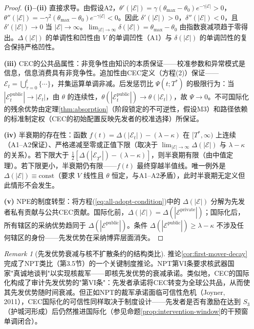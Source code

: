 \documentclass[12pt,a4paper]{ctexart}
\theoremstyle{definition}
\theoremstyle{remark}
\newtheorem{remark}{Remark}[section]
\begin{document}
\begin{proof}
\textbf{(i)--(ii)} 直接求导。由假设A2，$\theta'(|\mathcal{E}|) = \gamma(\theta_{\max} - \theta_0)e^{-\gamma |\mathcal{E}|} > 0$，$\theta''(|\mathcal{E}|) = -\gamma^2(\theta_{\max} - \theta_0)e^{-\gamma |\mathcal{E}|} < 0$。因此 $\delta'(|\mathcal{E}|) > 0$，$\delta''(|\mathcal{E}|) < 0$，且 $\delta'(|\mathcal{E}|) \to 0$ 当 $|\mathcal{E}| \to \infty$。$\lim_{|\mathcal{E}| \to \infty} \delta(|\mathcal{E}|) = \theta_{\max} - \theta_0$ 由指数衰减项趋于零得出。$\Delta(|\mathcal{E}|)$ 的单调性和凹性由 $V$ 的单调凹性（A1）与 $\delta(|\mathcal{E}|)$ 的单调凹性的复合保持严格凹性。

\textbf{(iii)} CEC的公共品属性：非竞争性由知识的本质保证——校准参数和异常模式是信息，信息消费具有非竞争性。追加性由CEC定义（方程(2)）保证——$\mathcal{E}_t = \bigcup_{\tau=0}^{t} \{\cdots\}$，并集运算单调非减。后发惩罚比 $\Psi(t; T^*)$ 的极限行为：当 $|\mathcal{E}_t^{\text{public}}| \to |\mathcal{E}_t|$，由 $\theta$ 的连续性，$\theta(|\mathcal{E}_t^{\text{public}}|) \to \theta(|\mathcal{E}_t|)$，故 $\Psi \to 0$。不可国际化的残余优势由定理\ref{thm:absorption}（阶段锁定的不可逆性，假设M3）和路径依赖的标准制定权（CEC的初始配置反映先发者的校准选择）所保证。

\textbf{(iv)} 半衰期的存在性：函数 $f(t) = \Delta(|\mathcal{E}_t|) - (\lambda - \kappa)$ 在 $[T^*, \infty)$ 上连续（A1--A2保证）、严格递减至零或正值下限（取决于 $\lim_{|\mathcal{E}| \to \infty} \Delta(|\mathcal{E}|)$ 与 $\lambda - \kappa$ 的关系）。若下限大于 $\frac{1}{2}[\Delta(|\mathcal{E}_{T^*}|) - (\lambda - \kappa)]$，则半衰期有限（由中值定理）。若下限更小，半衰期仍有限——$f(t)$ 最终穿越半值线。唯一例外是 $\Delta(|\mathcal{E}|) \equiv \text{const}$（要求 $V$ 线性且 $\theta$ 恒定，与A1--A2矛盾），此时半衰期无定义但此情形不会发生。

\textbf{(v)} NPE的制度转型：将方程(\ref{eq:all-adopt-condition})中的 $\Delta(|\mathcal{E}|)$ 分解为先发者私有贡献与公共CEC贡献。国际化前，$\Delta(|\mathcal{E}|) = \Delta(|\mathcal{E}^{\text{private}}|)$；国际化后，所有辖区的采纳优势趋同于 $\Delta(|\mathcal{E}^{\text{public}}|)$。条件 $\Delta(|\mathcal{E}^{\text{public}}|) \geq \lambda - \kappa$ 不涉及任何辖区的身份——先发优势在采纳博弈层面消失。
\end{proof}

\begin{remark}[先发优势衰减与核不扩散条约的结构类比]
推论\ref{cor:first-mover-decay}完成了NPT类比（第3.5节）的一个关键制度推论。NPT第VI条要求核武器国家"真诚地谈判"以实现核裁军——即核先发优势的衰减承诺。类似地，CEC的国际化构成了审计先发优势的"第VI条"：先发者承诺将CEC转变为全球公共品，从而使其先发优势随时间衰减。但正如NPT的裁军承诺面临可信性危机（Joyner, 2011），CEC国际化的可信性同样取决于制度设计——先发者是否有激励在达到 $S_3$（护城河形成）后仍然推进国际化（参见命题\ref{prop:intervention-window}的干预窗单调闭合）。
\end{remark}
\end{document}
